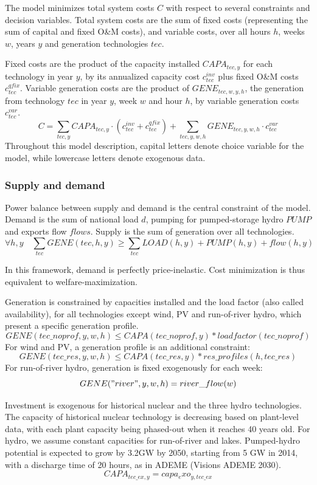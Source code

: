 The model minimizes total system costs $C$ with respect to several constraints and decision variables. Total system costs are the sum of fixed costs (representing the sum of capital and fixed O\&M costs), and variable costs, over all hours $h$, weeks $w$, years $y$ and generation technologies $tec$. 

Fixed costs are the product of the capacity installed $CAPA_{tec,y}$ for each technology in year $y$, by its annualized capacity cost $c_{tec}^{inv}$ plus fixed O\&M costs $c_{tec}^{qfix}$. 
Variable generation costs are the product of $GENE_{tec,w,y,h}$, the generation from technology $tec$ in year $y$, week $w$ and hour $h$, by variable generation costs $c_{tec}^{var}$.
\begin{equation}
C =\sum_{tec,y} CAPA_{tec,y} \cdot ( c_{tec}^{inv} + c_{tec}^{qfix} ) + \sum_{tec,y,w,h} GENE_{tec,y,w,h} \cdot c_{tec}^{var}
\end{equation}
Throughout this model description, capital letters denote choice variable for the model, while lowercase letters denote exogenous data.

\subsubsection{Supply and demand}

Power balance between supply and demand is the central constraint of the model. Demand is the sum of national load $d$, pumping for pumped-storage hydro $PUMP$ and exports flow $flows$. 
Supply is the sum of generation over all technologies.
$$\forall h,y \quad \sum_{tec} GENE(tec,h,y) \geq \sum_{tec} LOAD(h,y) + PUMP(h,y) + flow(h,y)$$

In this framework, demand is perfectly price-inelastic. Cost minimization is thus equivalent to welfare-maximization.

Generation is constrained by capacities installed and the load factor (also called availability), for all technologies except wind, PV and run-of-river hydro, which present a specific generation profile.
$$GENE(tec\_noprof,y,w,h) \leq CAPA(tec\_noprof,y)*loadfactor(tec\_noprof)$$
For wind and PV, a generation profile is an additional constraint:
$$GENE(tec\_res,y,w,h) \leq CAPA(tec\_res,y)*res\_profiles(h,tec\_res)$$
For run-of-river hydro, generation is fixed exogenously for each week:
$$GENE("river",y,w,h) = river\_flow(w)$$

Investment is exogenous for historical nuclear and the three hydro technologies. The capacity of historical nuclear technology is decreasing based on plant-level data, with each plant capacity being phased-out when it reaches 40 years old. For hydro, we assume constant capacities for run-of-river and lakes. Pumped-hydro potential is expected to grow by 3.2GW by 2050, starting from 5 GW in 2014, with a discharge time of 20 hours, as in ADEME (Visions ADEME 2030).
$$CAPA_{tec\_ex,y} = capa_exo_{y,tec\_ex} $$

